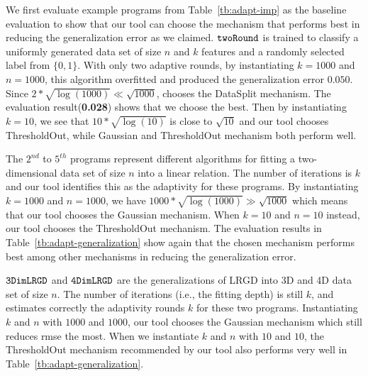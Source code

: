 

We first evaluate example programs from Table~\ref{tb:adapt-imp} as the baseline evaluation to show that our tool can choose the mechanism that performs best in reducing the generalization error as we claimed.
$\mathtt{twoRound}$ is trained to classify a uniformly generated data set of size $n$ and $k$ features and a randomly selected label from $\{0, 1\}$. 
With only two adaptive rounds, by instantiating $k = 1000$ and $n = 1000$, this algorithm overfitted and produced the generalization error 
$0.050$.
Since $2* \sqrt{\log(1000)} \ll \sqrt{1000}$, {\THESYSTEM} chooses the DataSplit mechanism.
The evaluation result(\textbf{0.028}) shows that we choose the best.
Then by instantiating $k = 10$, we see that $10 * \sqrt{\log(10)}$ is close to $\sqrt{10}$ and our tool chooses ThresholdOut, while Gaussian and ThresholdOut mechanism both perform well.

The $2^{nd}$ to $5^{th}$ programs represent different algorithms for fitting a two-dimensional data set of size $n$ into a linear relation.
The number of iterations is $k$ and our tool identifies this as the  adaptivity  for these programs.
By instantiating $k = 1000$ and $n = 1000$, we have
$1000* \sqrt{\log(1000)} \gg \sqrt{1000}$ which means that our tool chooses the Gaussian mechanism. When $k=10$ and $n=10$ instead, our tool chooses the ThresholdOut mechanism. 
The evaluation results in Table~\ref{tb:adapt-generalization} show again that the chosen mechanism performs best among other mechanisms in reducing the generalization error.

$  \mathtt{ 3DimLRGD }$ and $  \mathtt{ 4DimLRGD }$ are the generalizations of LRGD into 3D and 4D data set of size $n$.
The number of iterations (i.e., the fitting depth) is still $k$, and {\THESYSTEM} estimates correctly the adaptivity rounds $k$ for these two programs.
Instantiating $k$ and $n$ with $1000$ and $1000$,
our tool chooses the Gaussian mechanism which still reduces rmse the most. When we instantiate $k$ and $n$ with $10$ and $10$, the ThresholdOut mechanism recommended by our tool also performs very well in Table~\ref{tb:adapt-generalization}. 

